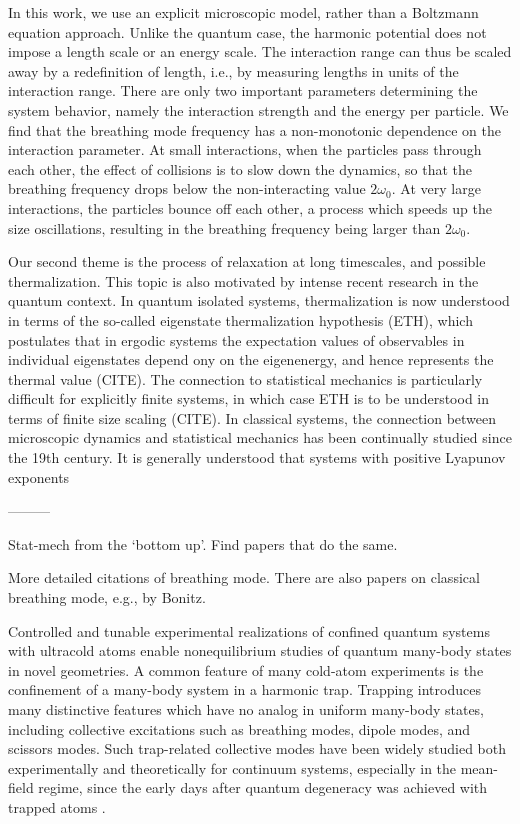 \documentclass[onecolumn,pra]{revtex4-1}
\begin{document}
In this work, we use an explicit microscopic model, rather than a Boltzmann equation approach.
Unlike the quantum case, the harmonic potential does not impose a length scale or an energy scale.
The interaction range can thus be scaled away by a redefinition of length, i.e., by measuring
lengths in units of the interaction range.  There are only two important parameters determining the
system behavior, namely the interaction strength and the energy per particle.  We find that the
breathing mode frequency has a non-monotonic dependence on the interaction parameter.  At small
interactions, when the particles pass through each other, the effect of collisions is to slow down
the dynamics, so that the breathing frequency drops below the non-interacting value $2\omega_0$.  At
very large interactions, the particles bounce off each other, a process which speeds up the size
oscillations, resulting in the breathing frequency being larger than $2\omega_0$.

Our second theme is the process of relaxation at long timescales, and possible thermalization.  This
topic is also motivated by intense recent research in the quantum context.  In quantum isolated
systems, thermalization is now understood in terms of the so-called eigenstate thermalization
hypothesis (ETH), which postulates that in ergodic systems the expectation values of observables in
individual eigenstates depend ony on the eigenenergy, and hence represents the thermal value (CITE).
The connection to statistical mechanics is particularly difficult for explicitly finite systems, in
which case ETH is to be understood in terms of finite size scaling (CITE).  In classical systems,
the connection between microscopic dynamics and statistical mechanics has been continually studied
since the 19th century.  It is generally understood that systems with positive Lyapunov exponents 



---------


Stat-mech from the `bottom up'.  Find papers that do the same. 

More detailed citations of breathing mode.  There are also papers on classical breathing mode, e.g.,
by Bonitz.  


Controlled and tunable experimental realizations of confined quantum systems with ultracold atoms
enable nonequilibrium studies of quantum many-body states in novel geometries. A common feature of
many cold-atom experiments is the confinement of a many-body system in a harmonic trap. Trapping
introduces many distinctive features which have no analog in uniform many-body states, including
collective excitations such as breathing modes, dipole modes, and scissors modes. Such trap-related
collective modes have been widely studied both experimentally and theoretically for continuum
systems, especially in the mean-field regime, since the early days after quantum degeneracy was
achieved with trapped atoms \cite{Dalfovo1997}\cite{Jin1996}.
\end{document}
